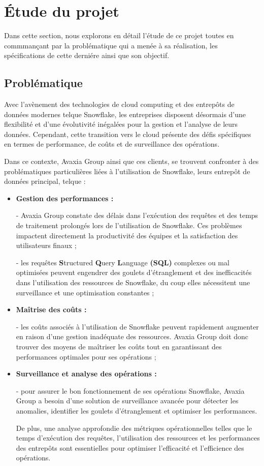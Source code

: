 \section{\'Etude du projet}
\par Dans cette section, nous explorons en détail l'étude de ce projet toutes en commmançant par la problématique qui a menée à sa réalisation, les spécifications de cette derniére ainsi que son objectif.
\subsection{Problématique}
\par Avec l'avènement des technologies de cloud computing et des entrepôts de données modernes telque Snowflake, les entreprises disposent désormais d'une flexibilité 
et d'une évolutivité inégalées pour la gestion et l'analyse de leurs données. 
Cependant, cette transition vers le cloud présente des défis spécifiques en termes de performance, de coûts et de surveillance des opérations. 
\par Dans ce contexte, Avaxia Group ainsi que ces clients, se trouvent confronter à des problématiques particulières liées à l'utilisation de Snowflake, leurs entrepôt de données principal, telque : 
\begin{itemize}
    \item \textbf{Gestion des performances : } \par - Avaxia Group constate des délais dans l'exécution des requêtes et des temps de traitement prolongés lors de l'utilisation de Snowflake. 
    Ces problèmes impactent directement la productivité des équipes et la satisfaction des utilisateurs finaux ;

    \par - les requêtes \textbf{S}tructured \textbf{Q}uery \textbf{L}anguage \textbf{(SQL)} complexes ou mal optimisées peuvent engendrer des goulets d'étranglement et des inefficacités dans l'utilisation des ressources de Snowflake, du coup elles
    nécessitent une surveillance et une optimisation constantes ;

    \item \textbf{Maîtrise des coûts :} \par - les coûts associés à l'utilisation de Snowflake peuvent rapidement augmenter en raison d'une gestion inadéquate des ressources. 
    Avaxia Group doit donc trouver des moyens de maîtriser les coûts tout en garantissant des performances optimales pour ses opérations ;

    \item \textbf{Surveillance et analyse des opérations :} \par - pour assurer le bon fonctionnement de ses opérations Snowflake, Avaxia Group a besoin d'une solution de surveillance avancée pour détecter les anomalies, identifier les goulets d'étranglement et optimiser les performances.
    \par De plus, une analyse approfondie des métriques opérationnelles telles que le temps d'exécution des requêtes, l'utilisation des ressources et les performances des entrepôts sont essentielles pour optimiser l'efficacité et l'efficience des opérations. 
\end{itemize}

